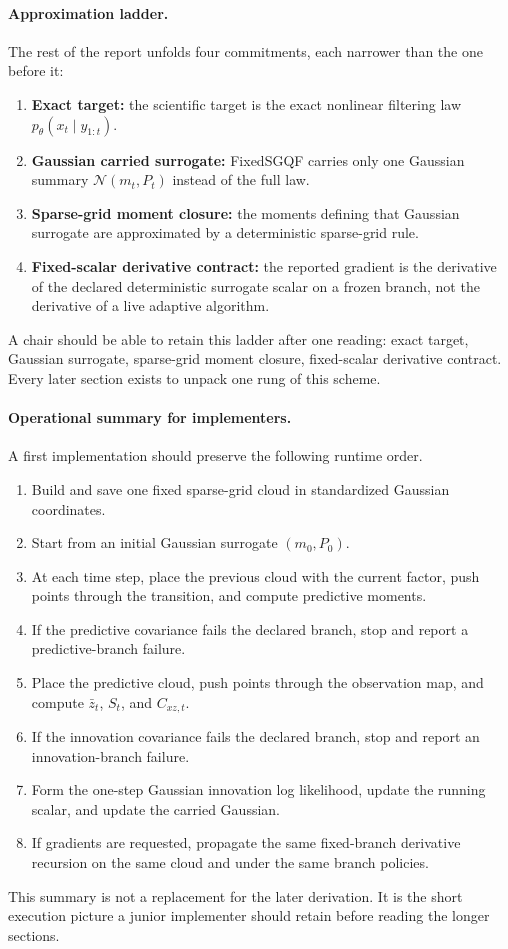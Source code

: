 \documentclass[11pt]{article}
\numberwithin{equation}{section}
\newcommand{\N}{\mathcal N}
\begin{document}
\paragraph{Approximation ladder.}
The rest of the report unfolds four commitments, each narrower than the one
before it:
\begin{enumerate}[leftmargin=0.28in]
  \item \textbf{Exact target:} the scientific target is the exact nonlinear
  filtering law \(p_\theta(x_t\mid y_{1:t})\).
  \item \textbf{Gaussian carried surrogate:} FixedSGQF carries only one
  Gaussian summary \(\N(m_t,P_t)\) instead of the full law.
  \item \textbf{Sparse-grid moment closure:} the moments defining that
  Gaussian surrogate are approximated by a deterministic sparse-grid rule.
  \item \textbf{Fixed-scalar derivative contract:} the reported gradient is the
  derivative of the declared deterministic surrogate scalar on a frozen branch,
  not the derivative of a live adaptive algorithm.
\end{enumerate}
A chair should be able to retain this ladder after one reading: exact target,
Gaussian surrogate, sparse-grid moment closure, fixed-scalar derivative
contract.  Every later section exists to unpack one rung of this scheme.

\paragraph{Operational summary for implementers.}
A first implementation should preserve the following runtime order.
\begin{enumerate}[leftmargin=0.28in]
  \item Build and save one fixed sparse-grid cloud in standardized Gaussian
  coordinates.
  \item Start from an initial Gaussian surrogate \((m_0,P_0)\).
  \item At each time step, place the previous cloud with the current factor,
  push points through the transition, and compute predictive moments.
  \item If the predictive covariance fails the declared branch, stop and report
  a predictive-branch failure.
  \item Place the predictive cloud, push points through the observation map,
  and compute \(\bar z_t\), \(S_t\), and \(C_{xz,t}\).
  \item If the innovation covariance fails the declared branch, stop and report
  an innovation-branch failure.
  \item Form the one-step Gaussian innovation log likelihood, update the running
  scalar, and update the carried Gaussian.
  \item If gradients are requested, propagate the same fixed-branch derivative
  recursion on the same cloud and under the same branch policies.
\end{enumerate}
This summary is not a replacement for the later derivation.  It is the short
execution picture a junior implementer should retain before reading the longer
sections.
\end{document}
